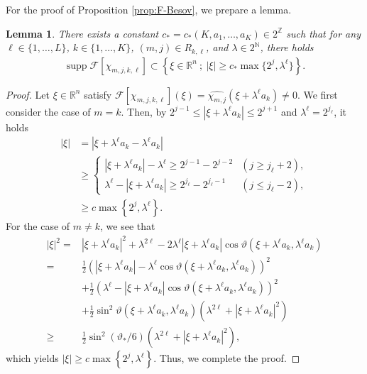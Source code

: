 \documentclass[a4paper,12pt,reqno]{amsart}
\theoremstyle{plain}
\newtheorem{lemm}[thm]{Lemma}
\theoremstyle{definition}
\newcommand{\supp}{\operatorname{supp}}
\renewcommand{\leq}{\leqslant}
\renewcommand{\geq}{\geqslant}
\newcommand{\R}{\mathbb{R}}
\newcommand{\N}{\mathbb{N}}
\newcommand{\Z}{\mathbb{Z}}
\newcommand{\lp}[1]{\left[#1\right]}
\newcommand{\Mp}[1]{\left\{#1\right\}}
\renewcommand{\sp}[1]{\left(#1\right)}
\begin{document}
For the proof of Proposition \ref{prop:F-Besov},
we prepare a lemma.
\begin{lemm}\label{lemm:chi}
    There exists a constant $c_*=c_*(K,a_1,\dots,a_K) \in 2^{\Z}$ such that
    for any $\ell \in \{1,\dots,L\}$, $k \in\{1,\dots,K\}$, $(m,j) \in R_{k,\ell}$, and $\lambda \in 2^{\N}$,
    there holds 
    \begin{align}
        \supp \mathscr{F}\lp{\chi_{m,j,k,\ell}}
        \subset
        \Mp{
        \xi \in \mathbb{R}^n\ ;\ |\xi| \geq c_* \max\{2^j,\lambda^{\ell}\}
        }.
    \end{align}
\end{lemm}
\begin{proof}
Let $\xi \in \R^n$ satisfy $\mathscr{F}\lp{\chi_{m,j,k,\ell}}(\xi)=\widehat{\chi_{m,j}}(\xi+\lambda^\ell a_k) \neq 0$.
We first consider the case of $m=k$.
Then, by $2^{j-1} \leq |\xi+\lambda^{\ell}a_k| \leq 2^{j+1}$ and $\lambda^{\ell}=2^{j_{\ell}}$, it holds
\begin{align}
    |\xi|
    &=
    |\xi+\lambda^\ell a_k - \lambda^\ell a_k|
    \\
    &\geq 
    \begin{cases}
        |\xi+\lambda^{\ell}a_k| - \lambda^{\ell}
        \geq 
        2^{j-1}-2^{j-2}
        &
        (j \geq j_{\ell}+2),
        \\
        \lambda^{\ell}-|\xi+\lambda^{\ell}a_k|
        \geq 
        2^{j_{\ell}}-2^{j_{\ell}-1}
        &
        (j \leq j_{\ell}-2),
    \end{cases}
    \\
    &\geq
    c
    \max\Mp{2^j,\lambda^{\ell}}.
\end{align}
For the case of $m\neq k$, we see that 
\begin{align}
    |\xi|^2
    ={}&
    |\xi+\lambda^{\ell}a_k|^2+\lambda^{2\ell}
    -
    2\lambda^{\ell}|\xi+\lambda^{\ell}a_k|\cos \vartheta(\xi+\lambda^{\ell}a_k,\lambda^{\ell}a_k)
    \\
    ={}&
    \frac{1}{2}\sp{|\xi+\lambda^{\ell}a_k|-\lambda^{\ell}\cos \vartheta(\xi+\lambda^{\ell}a_k,\lambda^{\ell}a_k)}^2
    \\
    &
    +
    \frac{1}{2}\sp{\lambda^{\ell}-|\xi+\lambda^{\ell}a_k|\cos \vartheta(\xi+\lambda^{\ell}a_k,\lambda^{\ell}a_k)}^2
    \\
    &
    +
    \frac{1}{2}
    \sin^2\vartheta(\xi+\lambda^{\ell}a_k,\lambda^{\ell}a_k)
    \sp{\lambda^{2\ell}+|\xi+\lambda^{\ell}a_k|^2}
    \\
    \geq{}&
    \frac{1}{2}
    \sin^2(\vartheta_*/6)
    \sp{\lambda^{2\ell}+|\xi+\lambda^{\ell}a_k|^2},
\end{align}
which yields $|\xi|\geq c\max\Mp{2^j,\lambda^{\ell}}$.
Thus, we complete the proof.
\end{proof}
\end{document}
